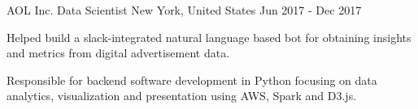 \begin{cventries}
  \cventry
    {AOL Inc.} %
    {Data Scientist} %
    {New York, United States} %
    {Jun 2017 - Dec 2017} %
    {
      \begin{cvitems} %
        \item {Helped build a slack-integrated natural language based bot for obtaining insights and metrics from digital advertisement data.}
        \item {Responsible for backend software development in Python focusing on data analytics, visualization and presentation using AWS, Spark and D3.js.}
      \end{cvitems}
    }
\end{cventries}
